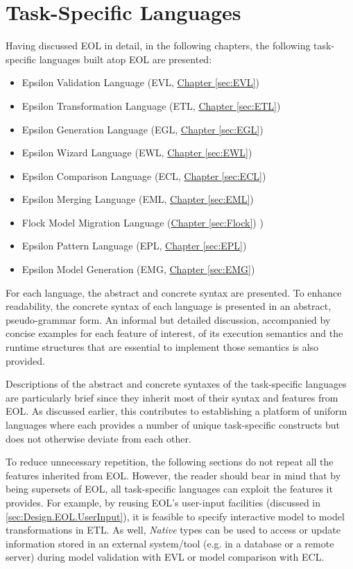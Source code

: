 \section{Task-Specific Languages}
\label{sec:TaskSpecificLanguages}

Having discussed EOL in detail, in the following chapters, the following task-specific languages built atop EOL are presented:

\begin{itemize}
	\item Epsilon Validation Language (EVL, \hyperref[sec:EVL]{Chapter \ref*{sec:EVL}})
	\item Epsilon Transformation Language (ETL, \hyperref[sec:ETL]{Chapter \ref*{sec:ETL}}) 
	\item Epsilon Generation Language (EGL, \hyperref[sec:EGL]{Chapter \ref*{sec:EGL}}) 
	\item Epsilon Wizard Language (EWL, \hyperref[sec:EWL]{Chapter \ref*{sec:EWL}}) 
	\item Epsilon Comparison Language (ECL, \hyperref[sec:ECL]{Chapter \ref*{sec:ECL}}) 
	\item Epsilon Merging Language (EML, \hyperref[sec:EML]{Chapter \ref*{sec:EML}}) 
	\item Flock Model Migration Language (\hyperref[sec:Flock]{Chapter \ref*{sec:Flock}}) )
	\item Epsilon Pattern Language (EPL, \hyperref[sec:EPL]{Chapter \ref*{sec:EPL}}) 
    \item Epsilon Model Generation (EMG, \hyperref[sec:EMG]{Chapter \ref*{sec:EMG}}) 
\end{itemize}

For each language, the abstract and concrete syntax are presented. To enhance readability, the concrete syntax of each language is presented in an abstract, pseudo-grammar form. An informal but detailed discussion, accompanied by concise examples for each feature of interest, of its execution semantics and the runtime structures that are essential to implement those semantics is also provided.

Descriptions of the abstract and concrete syntaxes of the task-specific languages are particularly brief since they inherit most of their syntax and features from EOL. As discussed earlier, this contributes to establishing a platform of uniform languages where each provides a number of unique task-specific constructs but does not otherwise deviate from each other.

To reduce unnecessary repetition, the following sections do not repeat all the features inherited from EOL. However, the reader should bear in mind that by being supersets of EOL, all task-specific languages can exploit the features it provides. For example, by reusing EOL's user-input facilities (discussed in \ref{sec:Design.EOL.UserInput}), it is feasible to specify interactive model to model transformations in ETL. As well, \emph{Native} types can be used to access or update information stored in an external system/tool (e.g. in a database or a remote server) during model validation with EVL or model comparison with ECL.

